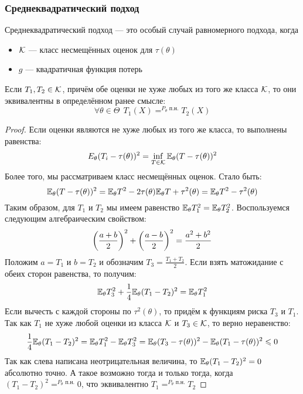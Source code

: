 \subsubsection{Среднеквадратический подход}

\begin{note}
	Среднеквадратический подход --- это особый случай равномерного подхода, когда
	\begin{itemize}
		\item $\mathcal{K}$ --- класс несмещённых оценок для $\tau(\theta)$
		
		\item $g$ --- квадратичная функция потерь
	\end{itemize}
\end{note}

\begin{proposition}
	Если $T_1, T_2 \in \mathcal{K}$, причём обе оценки не хуже любых из того же класса $\mathcal{K}$, то они эквивалентны в определённом ранее смысле:
	\[
		\forall \theta \in \Theta\ \ T_1(X) =^{P_\theta\text{ п.н.}} T_2(X)
	\]
\end{proposition}

\begin{proof}
	Если оценки являются не хуже любых из того же класса, то выполнены равенства:
	\[
		E_\theta (T_i - \tau(\theta))^2 = \inf_{T \in \mathcal{K}} \mathbb{E}_\theta (T - \tau(\theta))^2
	\]
	Более того, мы рассматриваем класс несмещённых оценок. Стало быть:
	\[
		\mathbb{E}_\theta (T - \tau(\theta))^2 = \mathbb{E}_\theta T^2 - 2\tau(\theta)\mathbb{E}_\theta T + \tau^2(\theta) = \mathbb{E}_\theta T^2 - \tau^2(\theta)
	\]
	Таким образом, для $T_1$ и $T_2$ мы имеем равенство $\mathbb{E}_\theta T_1^2 = \mathbb{E}_\theta T_2^2$. Воспользуемся следующим алгебраическим свойством:
	\[
		\left(\frac{a + b}{2}\right)^2 + \left(\frac{a - b}{2}\right)^2 = \frac{a^2 + b^2}{2}
	\]
	Положим $a = T_1$ и $b = T_2$ и обозначим $T_3 = \frac{T_1 + T_2}{2}$. Если взять матожидание с обеих сторон равенства, то получим:
	\[
		\mathbb{E}_\theta T_3^2 + \frac{1}{4}\mathbb{E}_\theta (T_1 - T_2)^2 = \mathbb{E}_\theta T_1^2
	\]
	Если вычесть с каждой стороны по $\tau^2(\theta)$, то придём к функциям риска $T_3$ и $T_1$. Так как $T_1$ не хуже любой оценки из класса $\mathcal{K}$ и $T_3 \in \mathcal{K}$, то верно неравенство:
	\[
		\frac{1}{4}\mathbb{E}_\theta (T_1 - T_2)^2 = \mathbb{E}_\theta T_1^2 - \mathbb{E}_\theta T_3^2 = \mathbb{E}_\theta (T_3 - \tau(\theta))^2 - \mathbb{E}_\theta (T_1 - \tau(\theta))^2 \leqslant 0
	\]
	Так как слева написана неотрицательная величина, то $\mathbb{E}_\theta (T_1 - T_2)^2 = 0$ абсолютно точно. А такое возможно тогда и только тогда, когда $(T_1 - T_2)^2 =^{P_\theta\text{ п.н.}} 0$, что эквивалентно $T_1 =^{P_\theta\text{ п.н.}} T_2$
\end{proof}

